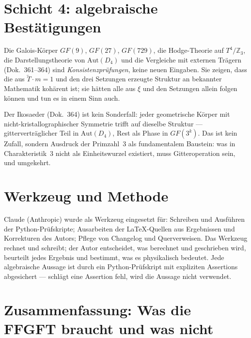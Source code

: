 \section{Schicht 4: algebraische Bestätigungen}

Die Galois-Körper $GF(9)$, $GF(27)$, $GF(729)$, die Hodge-Theorie auf $T^4/\mathbb{Z}_3$,
die Darstellungstheorie von $\mathrm{Aut}(D_4)$ und die Vergleiche mit externen
Trägern (Dok.~361--364) sind \emph{Konsistenzprüfungen}, keine neuen Eingaben.
Sie zeigen, dass die aus $\tilde{T}\cdot m=1$ und den drei Setzungen erzeugte
Struktur an bekannter Mathematik kohärent ist; sie hätten alle aus $\xi$ und
den Setzungen allein folgen können und tun es in einem Sinn auch.

Der Ikosaeder (Dok.~364) ist kein Sonderfall: jeder geometrische Körper mit
nicht-kristallographischer Symmetrie trifft auf dieselbe Struktur ---
gitterverträglicher Teil in $\mathrm{Aut}(D_4)$, Rest als Phase in $GF(3^k)$.
Das ist kein Zufall, sondern Ausdruck der Primzahl~3 als fundamentalem
Baustein: was in Charakteristik~3 nicht als Einheitswurzel existiert, muss
Gitteroperation sein, und umgekehrt.

\section*{Werkzeug und Methode}

Claude (Anthropic) wurde als Werkzeug eingesetzt für: Schreiben und Ausführen
der Python-Prüfskripte; Ausarbeiten der \LaTeX-Quellen aus Ergebnissen und
Korrekturen des Autors; Pflege von Changelog und Querverweisen. Das Werkzeug
rechnet und schreibt; der Autor entscheidet, was berechnet und geschrieben wird,
beurteilt jedes Ergebnis und bestimmt, was es physikalisch bedeutet. Jede
algebraische Aussage ist durch ein Python-Prüfskript mit expliziten Assertions
abgesichert --- schlägt eine Assertion fehl, wird die Aussage nicht verwendet.

\section{Zusammenfassung: Was die FFGFT braucht und was nicht}

